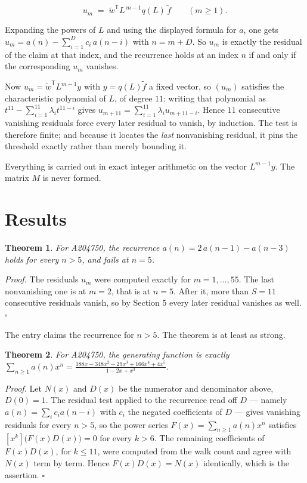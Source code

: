 \documentclass[11pt]{article}
\newtheorem{theorem}{Theorem}
\theoremstyle{definition}
\begin{document}
\[u_m \;=\; \tilde w^{\mathsf T} L^{\,m-1} q(L)\,\tilde f \qquad (m \ge 1).\]

Expanding the powers of $L$ and using the displayed formula for $a$, one gets $u_m = a(n) - \sum_{i=1}^{D} c_i\,a(n-i)$ with $n = m + D$. So $u_m$ is exactly the residual of the claim at that index, and the recurrence holds at an index $n$ if and only if the corresponding $u_m$ vanishes.

Now $u_m = \tilde w^{\mathsf T} L^{m-1} y$ with $y = q(L)\tilde f$ a fixed vector, so $(u_m)$ satisfies the characteristic polynomial of $L$, of degree $11$: writing that polynomial as $t^{11} - \sum_{i=1}^{11} \lambda_i t^{11-i}$ gives $u_{m+11} = \sum_{i=1}^{11} \lambda_i u_{m+11-i}$. Hence $11$ consecutive vanishing residuals force every later residual to vanish, by induction. The test is therefore finite; and because it locates the {\itshape last} nonvanishing residual, it pins the threshold exactly rather than merely bounding it.

Everything is carried out in exact integer arithmetic on the vector $L^{m-1}y$. The matrix $M$ is never formed.

\section{Results}

\begin{theorem} For A204750, the recurrence $a(n) = 2\,a(n-1) - a(n-3)$ holds for every $n > 5$, and fails at $n = 5$.\end{theorem}

{\itshape Proof.} The residuals $u_m$ were computed exactly for $m = 1,\dots,55$. The last nonvanishing one is at $m = 2$, that is at $n = 5$. After it, more than $S = 11$ consecutive residuals vanish, so by Section 5 every later residual vanishes as well. $\square$

The entry claims the recurrence for $n > 5$. The theorem is at least as strong.

\begin{theorem} For A204750, the generating function is exactly $\sum_{n\ge 1} a(n)x^n = \frac{188x - 348x^{2} - 29x^{3} + 166x^{4} + 4x^{5}}{1 - 2x + x^{3}}$.\end{theorem}

{\itshape Proof.} Let $N(x)$ and $D(x)$ be the numerator and denominator above, $D(0)=1$. The residual test applied to the recurrence read off $D$ --- namely $a(n) = \sum_i c_i a(n-i)$ with $c_i$ the negated coefficients of $D$ --- gives vanishing residuals for every $n > 5$, so the power series $F(x)=\sum_{n\ge 1}a(n)x^n$ satisfies $[x^k]\bigl(F(x)D(x)\bigr) = 0$ for every $k > 6$. The remaining coefficients of $F(x)D(x)$, for $k \le 11$, were computed from the walk count and agree with $N(x)$ term by term. Hence $F(x)D(x) = N(x)$ identically, which is the assertion. $\square$
\end{document}
